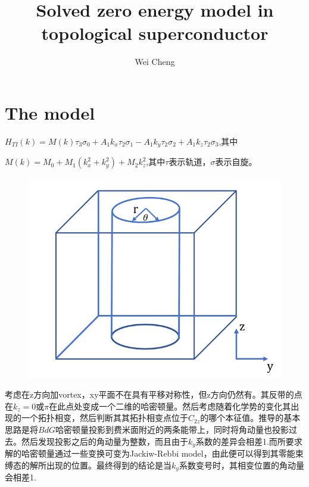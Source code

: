 \documentclass[22pt]{article}
\title{\Huge {\vspace{-2cm}Solved zero energy model in topological superconductor}}
\author{\LARGE {Wei Cheng}}
\date{}
\begin{document}
	\Large
	\maketitle
	\section*{The model}
	$H_{TI}(k)=M(k)\tau_3\sigma_0+A_1k_x\tau_2\sigma_1-A_1k_y\tau_2\sigma_2+A_1k_z\tau_2\sigma_3$,其中
	\par $M(k)=M_0+M_1(k_x^2+k_y^2)+M_2k_z^2$,其中$\tau$表示轨道，$\sigma$表示自旋。
	\begin{figure}[ht]
		\centering
		\includegraphics[scale=0.5]{Picture/1}
	\end{figure}
考虑在z方向加vortex，xy平面不在具有平移对称性，但z方向仍然有。其反带的点在$k_z=0或\pi$在此点处变成一个二维的哈密顿量。然后考虑随着化学势的变化其出现的一个拓扑相变，然后判断其其拓扑相变点位于$C_{2z}$的哪个本征值。推导的基本思路是将$BdG$哈密顿量投影到费米面附近的两条能带上，同时将角动量也投影过去。然后发现投影之后的角动量为整数，而且由于$k_y$系数的差异会相差1.而所要求解的哈密顿量通过一些变换可变为Jackiw-Rebbi model，由此便可以得到其零能束缚态的解所出现的位置。最终得到的结论是当$k_y$系数变号时，其相变位置的角动量会相差1.
\end{document}
